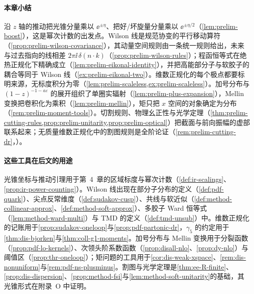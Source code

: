 \paragraph{本章小结}
沿 $z$ 轴的推动把光锥分量乘以 $\ee^{\pm\eta}$、把好/坏旋量分量乘以 $\ee^{\pm\eta/2}$（\cref{lem:prelim-boost}），这是幂次计数的出发点。Wilson 线是规范协变的平行移动算符（\cref{prop:prelim-wilson-covariance}），其动量空间规则由一条统一规则给出，未来与过去指向的线相差 $2\pi\ii\,\delta(n\cdot k)$（\cref{prop:prelim-wilson-rules}）；程函恒等式在绝热正规化下精确成立（\cref{lem:prelim-eikonal-identity}），并把高能部分子与软胶子的耦合等同于 Wilson 线（\cref{ex:prelim-eikonal-two}）。维数正规化的每个极点都要标明来源，无标度积分为零（\cref{lem:prelim-scaleless,ex:prelim-scaleless}）。加号分布与 $(1-z)^{-1-a\varepsilon}$ 的展开组织了单圈实辐射（\cref{lem:prelim-plus-expansion}），Mellin 变换把卷积化为乘积（\cref{lem:prelim-mellin}），矩只把 $x$ 空间的对象确定为分布（\cref{rem:prelim-moment-tools}）。切割规则、物理幺正性与光学定理（\cref{thm:prelim-cutting-rules,prop:prelim-unitarity,prop:prelim-optical}）把截面与前向振幅的虚部联系起来；无质量维数正规化中的割图规则是全阶论证（\cref{rem:prelim-cutting-dr}，\tagA）。

\paragraph{这些工具在后文的用途}
光锥坐标与推动引理用于第~4~章的区域标度与幂次计数（\cref{def:ir-scalings}、\cref{prop:ir-power-counting}）。Wilson 线出现在部分子分布的定义（\cref{def:pdf-quark}）、尖点反常维度（\cref{def:sudakov-cusp}）、共线与软近似（\cref{def:method-collinear-approx}、\cref{def:method-soft-approx}）、多胶子 Ward 恒等式（\cref{lem:method-ward-multi}）与 TMD 的定义（\cref{def:tmd-unsub}）中。维数正规化的记账用于\cref{prop:sudakov-oneloop}与\cref{prop:pdf-partonic-dr}，$\gamma_5$ 的约定用于\cref{thm:dis-bjorken}与\cref{thm:coll-g1-moments}。加号分布与 Mellin 变换用于分裂函数（\cref{prop:pdf-lo-kernels}）、次领头阶系数函数（\cref{prop:disall-nlo}、\cref{prop:dy-nlo}）与阈值区（\cref{prop:thr-oneloop}）；矩问题的工具用于\cref{cor:dis-weak-xspace}、\cref{rem:dis-nonuniform}与\cref{rem:pdf-ns-plusminus}。割图与光学定理是\cref{thm:ee-R-finite}、\cref{prop:dis-dispersion}、\cref{prop:method-fsi}与\cref{lem:method-soft-unitarity}的基础，其光锥形式在附录~O 中证明。

